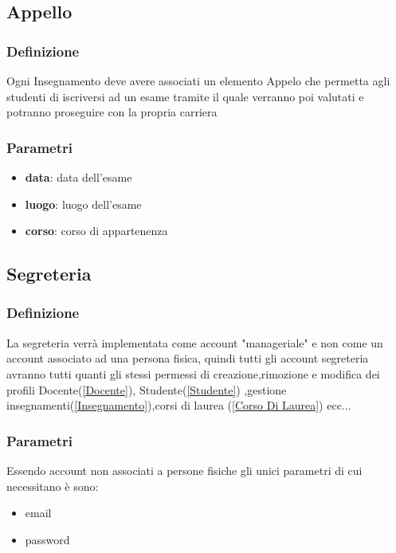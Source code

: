    
\subsection{Appello} \label{appello}
\subsubsection{Definizione}
Ogni Insegnamento deve avere associati un elemento Appelo che permetta agli studenti di iscriversi ad un esame tramite il quale verranno poi valutati e potranno proseguire con la propria carriera
\subsubsection{Parametri}

\begin{itemize}
    \item \textbf{data}: data dell'esame
    \item \textbf{luogo}: luogo dell'esame
    \item \textbf{corso}: corso di appartenenza
\end{itemize}
\subsection{Segreteria} \label{segreteria}
\subsubsection{Definizione}
La segreteria verrà implementata come account "manageriale" e non come un account associato ad una persona fisica, quindi tutti gli account segreteria avranno tutti quanti gli stessi permessi di creazione,rimozione e modifica dei profili Docente(\ref{Docente}), Studente(\ref{Studente}) ,gestione insegnamenti(\ref{Insegnamento}),corsi di laurea (\ref{Corso Di Laurea}) ecc...  
\subsubsection{Parametri}
Essendo account non associati a persone fisiche gli unici parametri di cui necessitano è sono:
\begin{itemize}
    \item email
    \item password
\end{itemize}
